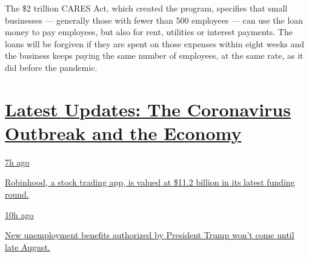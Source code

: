 The \$2 trillion CARES Act, which created the program, specifies that
small businesses --- generally those with fewer than 500 employees ---
can use the loan money to pay employees, but also for rent, utilities or
interest payments. The loans will be forgiven if they are spent on those
expenses within eight weeks and the business keeps paying the same
number of employees, at the same rate, as it did before the pandemic.

\hypertarget{latest-updates-the-coronavirus-outbreak-and-the-economy}{%
\section{\texorpdfstring{\href{https://www.nytimes3xbfgragh.onion/live/2020/08/17/business/stock-market-today-coronavirus?action=click\&pgtype=Article\&state=default\&region=MAIN_CONTENT_1\&context=storylines_live_updates}{Latest
Updates: The Coronavirus Outbreak and the
Economy}}{Latest Updates: The Coronavirus Outbreak and the Economy}}\label{latest-updates-the-coronavirus-outbreak-and-the-economy}}

\href{https://www.nytimes3xbfgragh.onion/live/2020/08/17/business/stock-market-today-coronavirus?action=click\&pgtype=Article\&state=default\&region=MAIN_CONTENT_1\&context=storylines_live_updates\#robinhood-a-stock-trading-app-is-valued-at-11-2-billion-in-its-latest-funding-round}{7h
ago}

\href{https://www.nytimes3xbfgragh.onion/live/2020/08/17/business/stock-market-today-coronavirus?action=click\&pgtype=Article\&state=default\&region=MAIN_CONTENT_1\&context=storylines_live_updates\#robinhood-a-stock-trading-app-is-valued-at-11-2-billion-in-its-latest-funding-round}{Robinhood,
a stock trading app, is valued at \$11.2 billion in its latest funding
round.}

\href{https://www.nytimes3xbfgragh.onion/live/2020/08/17/business/stock-market-today-coronavirus?action=click\&pgtype=Article\&state=default\&region=MAIN_CONTENT_1\&context=storylines_live_updates\#new-unemployment-benefits-authorized-by-president-trump-wont-come-until-late-august}{10h
ago}

\href{https://www.nytimes3xbfgragh.onion/live/2020/08/17/business/stock-market-today-coronavirus?action=click\&pgtype=Article\&state=default\&region=MAIN_CONTENT_1\&context=storylines_live_updates\#new-unemployment-benefits-authorized-by-president-trump-wont-come-until-late-august}{New
unemployment benefits authorized by President Trump won't come until
late August.}

